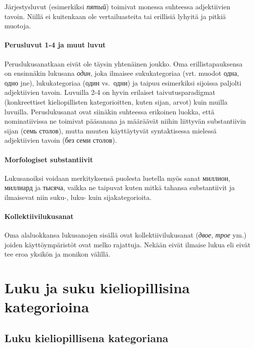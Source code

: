 \documentclass[]{scrreprt}
\begin{document}
Järjestysluvut (esimerkiksi \emph{пятый}) toimivat monessa suhteessa
adjektiivien tavoin. Niillä ei kuitenkaan ole vertailuasteita tai
erillisiä lyhyitä ja pitkiä muotoja.

\subsubsection{Perusluvut 1-4 ja muut
luvut}\label{perusluvut-1-4-ja-muut-luvut}

Peruslukusanatkaan eivät ole täysin yhtenäinen joukko. Oma
erillistapauksensa on ensinnäkin lukusana \emph{один}, joka ilmaisee
sukukategoriaa (vrt. muodot одна, одно jne), lukukategoriaa (один
vs.~одни) ja taipuu esimerkiksi sijoissa paljolti adjektiivien tavoin.
Luvuilla 2-4 on hyvin erilaiset taivutusparadigmat (konkreettiset
kieliopillisten kategorioitten, kuten sijan, arvot) kuin muilla
luvuilla. Peruslukusanat ovat siinäkin suhteessa erikoinen luokka, että
nominatiivissa ne toimivat pääsanana ja määräävät niihin liittyvän
substantiivin sijan (семь столов), mutta muuten käyttäytyvät
syntaktisessa mielessä adjektiivien tavoin (без семи столов).

\subsubsection{Morfologiset substantiivit}\label{morfologiset-substantiivit}

Lukusanoiksi voidaan merkityksensä puolesta luetella myös sanat миллион,
миллиард ja тысяча, vaikka ne taipuvat kuten mitkä tahansa substantiivit
ja ilmaisevat niin suku-, luku- kuin sijakategorioita.

\subsubsection{Kollektiivilukusanat}\label{kollektiivilukusanat}

Oma alaluokkansa lukusanojen sisällä ovat kollektiivilukusanat
(\emph{двое}, \emph{трое} ym.) joiden käyttöympäristöt ovat melko
rajattuja. Nekään eivät ilmaise lukua eli eivät tee eroa yksikön ja
monikon välillä.

\chapter{Luku ja suku kieliopillisina
kategorioina}\label{luento-3-luku-ja-suku-kieliopillisina-kategorioina}


\section{Luku kieliopillisena
kategoriana}\label{luku-kieliopillisena-kategoriana}
\end{document}
